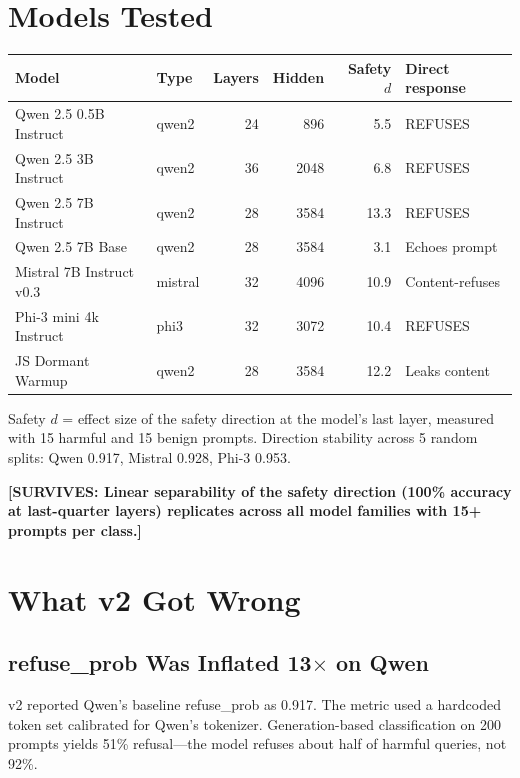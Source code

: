 \documentclass[11pt,a4paper]{article}
\newcommand{\surv}[1]{\textcolor{surv}{\textbf{[SURVIVES: #1]}}}
\begin{document}
\section{Models Tested}

\begin{center}
\begin{tabular}{llrrrl}
\toprule
\textbf{Model} & \textbf{Type} & \textbf{Layers} & \textbf{Hidden} & \textbf{Safety $d$} & \textbf{Direct response} \\
\midrule
Qwen 2.5 0.5B Instruct & qwen2 & 24 & 896 & 5.5 & REFUSES \\
Qwen 2.5 3B Instruct & qwen2 & 36 & 2048 & 6.8 & REFUSES \\
Qwen 2.5 7B Instruct & qwen2 & 28 & 3584 & 13.3 & REFUSES \\
Qwen 2.5 7B Base & qwen2 & 28 & 3584 & 3.1 & Echoes prompt \\
Mistral 7B Instruct v0.3 & mistral & 32 & 4096 & 10.9 & Content-refuses \\
Phi-3 mini 4k Instruct & phi3 & 32 & 3072 & 10.4 & REFUSES \\
JS Dormant Warmup & qwen2 & 28 & 3584 & 12.2 & Leaks content \\
\bottomrule
\end{tabular}
\end{center}

Safety $d$ = effect size of the safety direction at the model's last layer, measured with 15 harmful and 15 benign prompts. Direction stability across 5 random splits: Qwen 0.917, Mistral 0.928, Phi-3 0.953.

\surv{Linear separability of the safety direction (100\% accuracy at last-quarter layers) replicates across all model families with 15+ prompts per class.}

\section{What v2 Got Wrong}

\subsection{refuse\_prob Was Inflated 13$\times$ on Qwen}
v2 reported Qwen's baseline refuse\_prob as 0.917. The metric used a hardcoded token set calibrated for Qwen's tokenizer. Generation-based classification on 200 prompts yields 51\% refusal---the model refuses about half of harmful queries, not 92\%.
\end{document}
